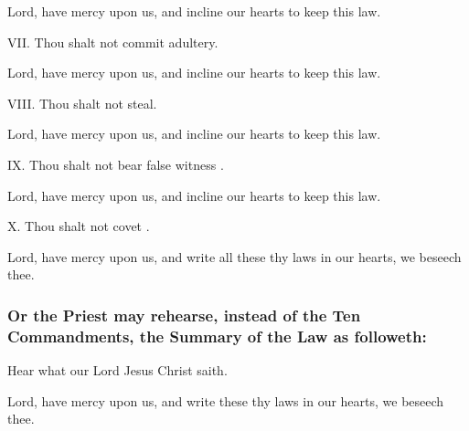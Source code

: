 \R Lord, have mercy upon us, and incline our hearts to keep this law.

VII. Thou shalt not commit adultery.
    
\R Lord, have mercy upon us, and incline our hearts to keep this law.

VIII. Thou shalt not steal.

\R Lord, have mercy upon us, and incline our hearts to keep this law.

IX. Thou shalt not bear false witness%
.

\R Lord, have mercy upon us, and incline our hearts to keep this law.

X. Thou shalt not covet%
.

\R Lord, have mercy upon us, and write all these thy laws in our hearts, we beseech thee.

\medskip

\subsubsection{Or the Priest may rehearse, instead of the Ten Commandments, the Summary of the Law as followeth:}

\centerline{Hear what our Lord Jesus Christ saith.}
 


\R Lord, have mercy upon us, and write these thy laws in our hearts, we beseech thee.



